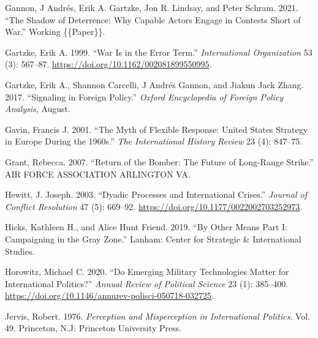 \documentclass[
]{article}
\newlength{\cslhangindent}
\newlength{\cslentryspacingunit} %
\newenvironment{CSLReferences}[2] %
 {%
  \setlength{\parindent}{0pt}
  \ifodd #1
  \let\oldpar\par
  \def\par{\hangindent=\cslhangindent\oldpar}
  \fi
  \setlength{\parskip}{#2\cslentryspacingunit}
 }%
 {}
\begin{document}
\begin{CSLReferences}{1}{0}
\leavevmode{}%
Gannon, J Andrés, Erik A. Gartzke, Jon R. Lindsay, and Peter Schram. 2021. {``The {Shadow} of {Deterrence}: {Why} Capable Actors Engage in Contests Short of War.''} Working \{\{Paper\}\}.

\leavevmode{}%
Gartzke, Erik A. 1999. {``War {Is} in the {Error Term}.''} \emph{International Organization} 53 (3): 567--87. \url{https://doi.org/10.1162/002081899550995}.

\leavevmode{}%
Gartzke, Erik A., Shannon Carcelli, J Andrés Gannon, and Jiakun Jack Zhang. 2017. {``Signaling in {Foreign Policy}.''} \emph{Oxford Encyclopedia of Foreign Policy Analysis}, August.

\leavevmode{}%
Gavin, Francis J. 2001. {``The {Myth} of {Flexible Response}: {United States Strategy} in {Europe} During the 1960s.''} \emph{The International History Review} 23 (4): 847--75.

\leavevmode{}%
Grant, Rebecca. 2007. {``Return of the {Bomber}: {The Future} of {Long-Range Strike}.''} {AIR FORCE ASSOCIATION ARLINGTON VA}.

\leavevmode{}%
Hewitt, J. Joseph. 2003. {``Dyadic {Processes} and {International Crises}.''} \emph{Journal of Conflict Resolution} 47 (5): 669--92. \url{https://doi.org/10.1177/0022002703252973}.

\leavevmode{}%
Hicks, Kathleen H., and Alice Hunt Friend. 2019. {``By {Other Means Part I}: {Campaigning} in the {Gray Zone}.''} {Lanham}: {Center for Strategic \& International Studies}.

\leavevmode{}%
Horowitz, Michael C. 2020. {``Do {Emerging Military Technologies Matter} for {International Politics}?''} \emph{Annual Review of Political Science} 23 (1): 385--400. \url{https://doi.org/10.1146/annurev-polisci-050718-032725}.

\leavevmode{}%
Jervis, Robert. 1976. \emph{Perception and Misperception in International Politics}. Vol. 49. {Princeton, N.J}: {Princeton University Press}.


\end{CSLReferences}
\end{document}
